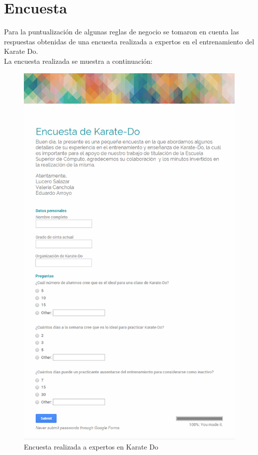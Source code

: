 \section{Encuesta}
\label{anex:encuesta}
Para la puntualización de algunas reglas de negocio se tomaron en cuenta las respuestas obtenidas de una encuesta realizada a expertos en el entrenamiento del Karate Do.\\

La encuesta realizada se muestra a continuación:

\begin{figure}[H]
	\begin{center}
		\includegraphics[scale=0.53]{./Figuras/Encuesta/Encuesta}
	\end{center}
	\caption{Encuesta realizada a expertos en Karate Do}
	\label{anex:Encuesta}
\end{figure}

